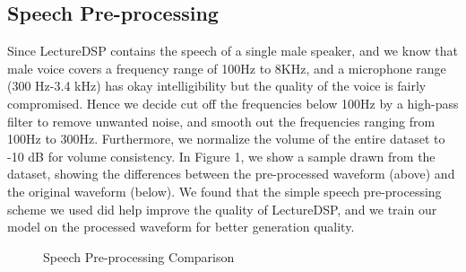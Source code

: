 \documentclass{article} %
\begin{document}
\begin{CJK}{UTF8}{bsmi}
\subsection{Speech Pre-processing}
Since LectureDSP contains the speech of a single male speaker, and we know that male voice covers a frequency range of 100Hz to 8KHz, and a microphone range (300 Hz-3.4 kHz) has okay intelligibility but the quality of the voice is fairly compromised. Hence we decide cut off the frequencies below 100Hz by a high-pass filter to remove unwanted noise, and smooth out the frequencies ranging from 100Hz to 300Hz. Furthermore, we normalize the volume of the entire dataset to -10 dB for volume consistency. In Figure 1, we show a sample drawn from the dataset, showing the differences between the pre-processed waveform (above) and the original waveform (below). We found that the simple speech pre-processing scheme we used did help improve the quality of LectureDSP, and we train our model on the processed waveform for better generation quality.
\begin{figure}[h]
\begin{center}
\end{center}
\caption{Speech Pre-processing Comparison}
\end{figure}


\end{CJK}
\end{document}
